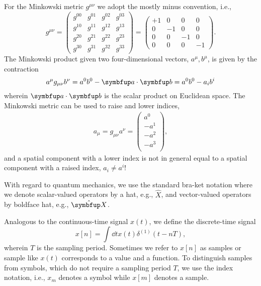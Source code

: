 For the Minkowski metric $g^{\mu\nu}$ we adopt the mostly minus convention, i.e.,
\begin{equation*}
	g^{\mu\nu}
	=
	\begin{pmatrix}
		g^{00} & g^{01} & g^{02} & g^{03} \\
		g^{10} & g^{11} & g^{12} & g^{13} \\
		g^{20} & g^{21} & g^{22} & g^{23} \\
		g^{30} & g^{31} & g^{32} & g^{33}
	\end{pmatrix}
	=
	\begin{pmatrix}
		+1 & 0 & 0 & 0 \\
		0 & -1 & 0 & 0 \\
		0 & 0 & -1 & 0 \\
		0 & 0 & 0 & -1
	\end{pmatrix}
	.
\end{equation*}
The Minkowski product given two four-dimensional vectors, $a^\mu,b^\mu$, is given by the contraction
\begin{equation*}
	a^\mu g_{\mu\nu} b^\nu
	=
	a^0 b^0
	-
	\vb{a}\vdot\vb{b}
	=
	a^0 b^0
	-
	a_i b^i
\end{equation*}
wherein $\vb{a}\vdot\vb{b}$ is the scalar product on Euclidean space.
The Minkowski metric can be used to raise and lower indices,
\begin{align*}
	a_\mu
	=
	g_{\mu\nu}
	a^\nu
	=
	\begin{pmatrix}
		a^0 \\
		-a^1 \\
		-a^2 \\
		-a^3 \\
	\end{pmatrix}
	,
\end{align*}
and a spatial component with a lower index is not in general equal to a spatial component with a raised index, $a_i\neq a^i$!

With regard to quantum mechanics, we use the standard bra-ket notation where we denote scalar-valued operators by a hat, e.g., $\hat{X}$, and vector-valued operators by boldface hat, e.g., $\vu{X}$.

Analogous to the continuous-time signal $x(t)$, we define the discrete-time signal
\begin{equation}
	x[n]
	=
	\int\dd{t}
	x(t)
	\delta^{(1)}(t-nT)
	,
\end{equation}
wherein $T$ is the sampling period.
Sometimes we refer to $x[n]$ as samples or sample like $x(t)$ corresponds to a value and a function.
To distinguish samples from symbols, which do not require a sampling period $T$, we use the index notation, i.e., $x_m$ denotes a symbol while $x[m]$ denotes a sample.